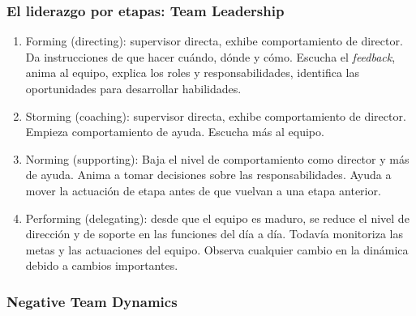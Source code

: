 \documentclass[]{article}
\begin{document}
\subsubsection{El liderazgo por etapas: Team Leadership}

\begin{enumerate}
	\item Forming (directing): supervisor directa, exhibe comportamiento de director. Da instrucciones de que hacer cuándo, dónde y cómo. Escucha el \textit{feedback}, anima al equipo, explica los roles y responsabilidades, identifica las oportunidades para desarrollar habilidades.
	\item Storming (coaching): supervisor directa, exhibe comportamiento de director. Empieza comportamiento de ayuda. Escucha más al equipo.
	\item Norming (supporting): Baja el nivel de comportamiento como director y más de ayuda. Anima a tomar decisiones sobre las responsabilidades. Ayuda a mover la actuación de etapa antes de que vuelvan a una etapa anterior.
	\item Performing (delegating): desde que el equipo es maduro, se reduce el nivel de dirección y de soporte en las funciones del día a día. Todavía monitoriza las metas y las actuaciones del equipo. Observa cualquier cambio en la dinámica debido a cambios importantes. 
\end{enumerate}

\subsubsection{Negative Team Dynamics}
\end{document}
